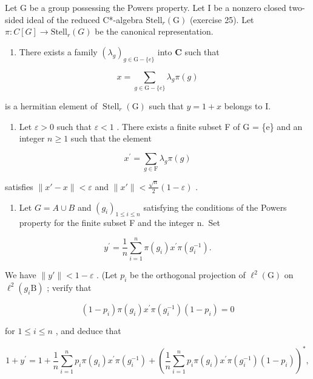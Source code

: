 Let G be a group possessing the Powers property. Let I be a nonzero closed two-sided ideal of the reduced C*-algebra \(\text{Stell}_{r}(\text{G})\) (exercise 25). Let \(\pi: C[G] \to \text{Stell}_{r}(G)\) be the canonical representation.

\begin{enumerate}
\def\labelenumi{\alph{enumi})}
\tightlist
\item
  There exists a family \((\lambda_g)_{g\in \mathrm{G - }\{e\}}\) into \(\mathbf{C}\) such that
\end{enumerate}

\[
x = \sum_ {g \in \mathrm{G} - \{e \}} \lambda_ {g} \pi (g)
\]

is a hermitian element of \(\operatorname{Stell}_{r}(\mathrm{G})\) such that \(y = 1 + x\) belongs to I.

\begin{enumerate}
\def\labelenumi{\alph{enumi})}
\setcounter{enumi}{1}
\tightlist
\item
  Let \(\varepsilon > 0\) such that \(\varepsilon < 1\) . There exists a finite subset F of G = \{e\} and an integer \(n \geqslant 1\) such that the element
\end{enumerate}

\[
x ^ {\prime} = \sum_ {g \in \mathrm{F}} \lambda_ {g} \pi (g)
\]

satisfies \(\|x' - x\| < \varepsilon\) and \(\|x'\| < \frac{\sqrt{n}}{2}(1 - \varepsilon)\) .

\begin{enumerate}
\def\labelenumi{\alph{enumi})}
\setcounter{enumi}{2}
\tightlist
\item
  Let \(G = A \cup B\) and \((g_{i})_{1 \leqslant i \leqslant n}\) satisfying the conditions of the Powers property for the finite subset F and the integer n.~Set
\end{enumerate}

\[
y ^ {\prime} = \frac {1}{n} \sum_ {i = 1} ^ {n} \pi (g _ {i}) x ^ {\prime} \pi (g _ {i} ^ {- 1}).
\]

We have \(\|y'\| < 1 - \varepsilon\) . (Let \(p_i\) be the orthogonal projection of \(\ell^{2}(\mathrm{G})\) on \(\ell^{2}(g_{i}\mathrm{B})\) ; verify that

\[
(1 - p _ {i}) \pi (g _ {i}) x ^ {\prime} \pi (g _ {i} ^ {- 1}) (1 - p _ {i}) = 0
\]

for \(1 \leqslant i \leqslant n\) , and deduce that

\[
1 + y ^ {\prime} = 1 + \frac {1}{n} \sum_ {i = 1} ^ {n} p _ {i} \pi (g _ {i}) x ^ {\prime} \pi (g _ {i} ^ {- 1}) + \left(\frac {1}{n} \sum_ {i = 1} ^ {n} p _ {i} \pi (g _ {i}) x ^ {\prime} \pi (g _ {i} ^ {- 1}) (1 - p _ {i})\right) ^ {*},
\]

